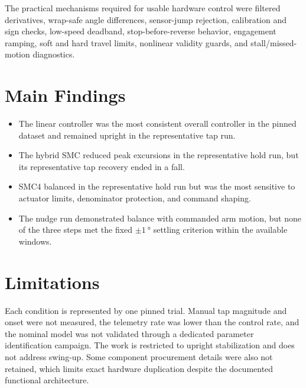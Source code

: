 The practical mechanisms required for usable hardware control were filtered
derivatives, wrap-safe angle differences, sensor-jump rejection, calibration
and sign checks, low-speed deadband, stop-before-reverse behavior, engagement
ramping, soft and hard travel limits, nonlinear validity guards, and
stall/missed-motion diagnostics.

\section{Main Findings}
\begin{itemize}
  \item The linear controller was the most consistent overall controller in
  the pinned dataset and remained upright in the representative tap run.
  \item The hybrid SMC reduced peak excursions in the representative hold run,
  but its representative tap recovery ended in a fall.
  \item SMC4 balanced in the representative hold run but was the most
  sensitive to actuator limits, denominator protection, and command shaping.
  \item The nudge run demonstrated balance with commanded arm motion, but none
  of the three steps met the fixed $\pm\SI{1}{\degree}$ settling criterion
  within the available windows.
\end{itemize}

\section{Limitations}
Each condition is represented by one pinned trial. Manual tap magnitude and
onset were not measured, the telemetry rate was lower than the control rate,
and the nominal model was not validated through a dedicated parameter
identification campaign. The work is restricted to upright stabilization and
does not address swing-up. Some component procurement details were also not
retained, which limits exact hardware duplication despite the documented
functional architecture.

